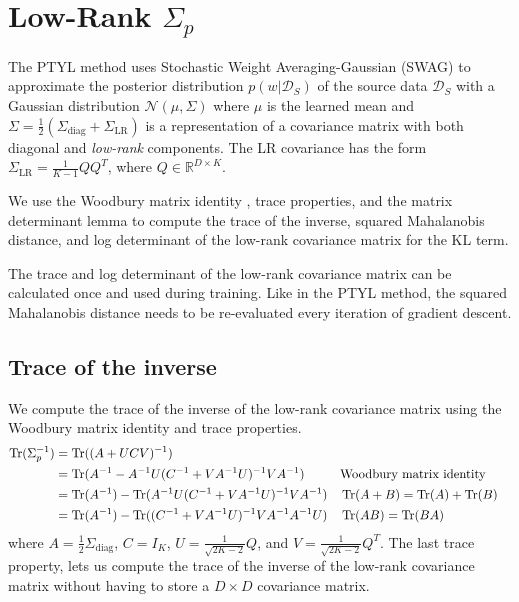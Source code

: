 \section{Low-Rank $\Sigma_p$}
\label{sec:low-rank}

The PTYL method \citep{shwartz2022pre} uses Stochastic Weight Averaging-Gaussian (SWAG) \citep{maddox2019simple} to approximate the posterior distribution $p(w|\mathcal{D}_S)$ of the source data $\mathcal{D}_S$ with a Gaussian distribution $\mathcal{N}(\mu, \Sigma)$ where $\mu$ is the learned mean and $\Sigma = \frac{1}{2}(\Sigma_{\text{diag}} + \Sigma_{\text{LR}})$ is a representation of a covariance matrix with both diagonal and \emph{low-rank} components.
The LR covariance has the form $\Sigma_{\textrm{LR}} = \frac{1}{K-1} Q Q^T$, where $Q \in \mathbb{R}^{D \times K}$.

We use the Woodbury matrix identity \cite{woodbury1950inverting}, trace properties, and the matrix determinant lemma to compute the trace of the inverse, squared Mahalanobis distance, and log determinant of the low-rank covariance matrix for the KL term.

The trace and log determinant of the low-rank covariance matrix can be calculated once and used during training.
Like in the PTYL method, the squared Mahalanobis distance needs to be re-evaluated every iteration of gradient descent.

\subsection{Trace of the inverse}
We compute the trace of the inverse of the low-rank covariance matrix using the Woodbury matrix identity and trace properties.
\begin{align*}
\operatorname{Tr} (\Sigma_p^{-1}) &= \operatorname{Tr}( (A + UCV )^{-1} ) \\
&= \operatorname{Tr} (A^{-1} - A^{-1}U(C^{-1} + VA^{-1}U)^{-1}VA^{-1}) && \text{Woodbury matrix identity} \\
&= \operatorname{Tr} (A^{-1}) - \operatorname{Tr}(A^{-1}U(C^{-1} + VA^{-1}U)^{-1}VA^{-1}) && \operatorname{Tr}(A+B) = \operatorname{Tr}(A) + \operatorname{Tr}(B) \\
&= \operatorname{Tr} (A^{-1}) - \operatorname{Tr}((C^{-1} + VA^{-1}U)^{-1}VA^{-1}A^{-1}U) && \operatorname{Tr}(AB) = \operatorname{Tr}(BA)
\end{align*}
where $A=\frac{1}{2}\Sigma_{\text{diag}}$, $C = I_K$, $U = \frac{1}{\sqrt{2K-2}}Q$, and $V=\frac{1}{\sqrt{2K-2}}Q^T$.
The last trace property, lets us compute the trace of the inverse of the low-rank covariance matrix without having to store a $D \times D$ covariance matrix.

